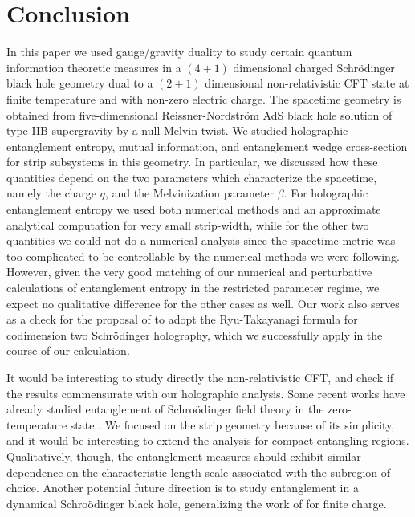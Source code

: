 \documentclass[12pt,a4paper]{article}
\numberwithin{equation}{section}
\begin{document}
\section{Conclusion} \label{conclusions}

In this paper we used gauge/gravity duality to study certain quantum information theoretic measures in a $\left(4+1\right)$ dimensional charged Schr\"{o}dinger black hole geometry dual to a $\left(2+1\right)$ dimensional non-relativistic CFT state at finite temperature and with non-zero electric charge. The spacetime geometry is obtained from five-dimensional Reissner-Nordstr\"{o}m AdS black hole solution of type-IIB supergravity by a null Melvin twist. We studied holographic entanglement entropy, mutual information, and entanglement wedge cross-section for strip subsystems in this geometry. In particular, we discussed how these quantities depend on the two parameters which characterize the spacetime, namely the charge $q$, and the Melvinization parameter $\beta$. For holographic entanglement entropy we used both numerical methods and an approximate analytical computation for very small strip-width, while for the other two quantities we could not do a numerical analysis since the spacetime metric was too complicated to be controllable by the numerical methods we were following. However, given the very good matching of our numerical and perturbative calculations of entanglement entropy in the restricted parameter regime, we expect no qualitative difference for the other cases as well. Our work also serves as a check for the proposal of \cite{Kim:2012nb} to adopt the Ryu-Takayanagi formula for codimension two Schr\"{o}dinger holography, which we successfully apply in the course of our calculation.

It would be interesting to study directly the non-relativistic CFT, and check if the results commensurate with our holographic analysis. Some recent works have already studied entanglement of Schro\"{o}dinger field theory in the zero-temperature state \cite{Mintchev:2022xqh, Mintchev:2022yuo}. We focused on the strip geometry because of its simplicity, and it would be interesting to extend the analysis for compact entangling regions. Qualitatively, though, the entanglement measures should exhibit similar dependence on the characteristic length-scale associated with the subregion of choice. Another potential future direction is to study entanglement in a dynamical Schro\"{o}dinger black hole, generalizing the work of \cite{Roychowdhury:2016wca} for finite charge.
\end{document}
